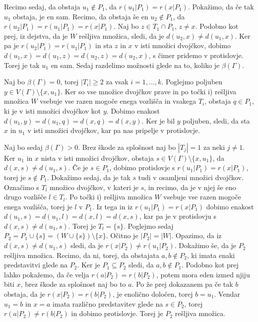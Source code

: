 \documentclass[mat1, tisk]{fmfdelo}
\begin{document}
\begin{dokaz}
  Recimo sedaj, da obstaja $u_1 \notin P_1$, da $r(u_1|P_1) = r(x|P_1)$. Pokažimo, da če tak 
  $u_1$ obstaja, je en sam. Recimo, da obstaja še en $u_2 \notin P_1$, da 
  $r(u_2|P_1) = r(u_1|P_1) = r(x|P_1)$. Naj bo $z \in T_1 \cap P_1$, $z \neq x$. Podobno kot prej, iz 
  dejstva, da je $W$ rešljiva množica, sledi, da je $d(u_2, x) \neq d(u_1, x)$. Ker pa je 
  $r(u_2|P_1) = r(u_1|P_1)$ in sta $z$ in $x$ v isti množici dvojčkov, dobimo 
  $d(u_1, x) = d(u_1, z) = d(u_2, z) = d(u_2, x)$, s čimer pridemo v protislovje. Torej je 
  tak $u_1$ en sam. Sedaj razdelimo možnosti glede na to, koliko je $\beta(\Gamma)$.

  Naj bo $\beta(\Gamma) = 0$, torej $|T_i| \geq 2$ za vsak $i = 1, \ldots, k$. Poglejmo 
  poljuben $y \in V(\Gamma) \setminus \{x, u_1\}$. Ker so vse množice dvojčkov prave in 
  po točki i) rešljiva množica $W$ vsebuje vse razen mogoče enega vozlišča in vsakega $T_i$, 
  obstaja $q \in P_1$, ki je v isti množici dvojčkov kot $y$. Dobimo enakost 
  $d(u_1, y) = d(u_1, q) = d(x, q) = d(x, y)$. Ker je bil $y$ poljuben, sledi, da 
  sta $x$ in $u_1$ v isti množici dvojčkov, kar pa nas pripelje v protislovje. 

  Naj bo sedaj $\beta(\Gamma) > 0$. Brez škode za splošnost naj bo $|T_j| = 1$ za neki $j \neq 1$. 
  Ker $u_1$ in $x$ nista v isti množici dvojčkov, 
  obstaja $s \in V(\Gamma) \setminus \{x, u_1\}$, da $d(x, s) \neq d(u_1, s)$. Če je $s \in P_1$, 
  dobimo protislovje s $r(u_1|P_1) = r(x|P_1)$, torej je $s \notin P_1$. Dokažimo sedaj, 
  da je tak $s$ tudi v osamljeni množici dvojčkov. Označimo s $T_l$ množico dvojčkov, v kateri 
  je $s$, in recimo, da je v njej še eno drugo vozlišče $l \in T_l$. Po točki i) rešljiva 
  množica $W$ vsebuje vse razen mogoče enega vozlišča, torej je $l$ v $P_1$. 
  Iz tega in iz $r(u_1|P_1) = r(x|P_1)$ dobimo enakost 
  $d(u_1, s) = d(u_1, l) = d(x, l) = d(x, s)$, kar pa je v 
  protislovju s $d(x, s) \neq d(u_1, s)$. Torej je $T_l = \{s\}$. Poglejmo sedaj 
  $P_2 = P_1 \cup \{s\} = (W \cup \{s\}) \setminus \{x\}$. Očitno je $|P_2| = |W|$. Opazimo, 
  da iz $d(x, s) \neq d(u_1, s)$ sledi, da je $r(x|P_2) \neq r(u_1|P_2)$. Dokažimo še, da je 
  $P_2$ rešljiva množica. Recimo, da ni, torej, da obstajata $a, b \notin P_2$, ki imata 
  enaki predstavitvi glede na $P_2$. Ker je $P_1 \subseteq P_2$ sledi, 
  da $a, b \notin P_1$. Podobno kot prej lahko pokažemo, da če velja $r(a|P_2) = r(b|P_2)$, 
  potem mora eden izmed njiju biti $x$, brez škode za splošnost naj bo to $a$. Po že prej 
  dokazanem pa če tak $b$ obstaja, da je $r(x|P_2) = r(b|P_2)$, je enolično določen, 
  torej $b = u_1$. Vendar $u_1 = b$ in $x = a$ imata različno predstavitev glede na $s \in P_2$, 
  torej $r(a|P_2) \neq r(b|P_2)$ in dobimo protislovje. Torej je $P_2$ rešljiva množica.


\end{dokaz}
\end{document}
